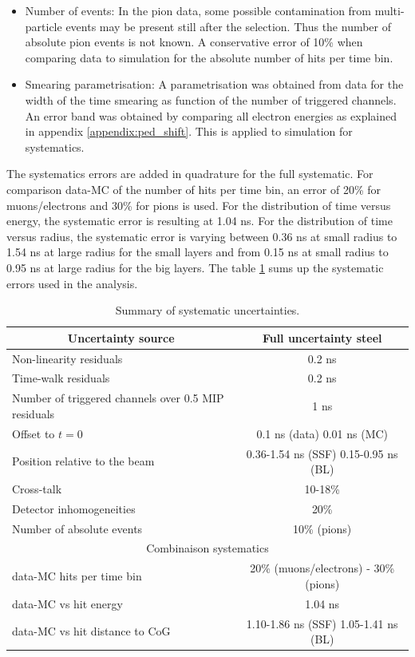 \begin{itemize}
	\item Number of events: In the pion data, some possible contamination from multi-particle events may be present still after the selection. Thus the number of absolute pion events is not known. A conservative error of 10\% when comparing data to simulation for the absolute number of hits per time bin.
	\item Smearing parametrisation: A parametrisation was obtained from data for the width of the time smearing as function of the number of triggered channels. An error band was obtained by comparing all electron energies as explained in appendix \ref{appendix:ped_shift}. This is applied to simulation for systematics.
\end{itemize}

The systematics errors are added in quadrature for the full systematic. For comparison data-MC of the number of hits per time bin, an error of 20\% for muons/electrons and 30\% for pions is used. For the distribution of time versus energy, the systematic error is resulting at 1.04 ns. For the distribution of time versus radius, the systematic error is varying between 0.36 ns at small radius to 1.54 ns at large radius for the small layers and from 0.15 ns at small radius to 0.95 ns at large radius for the big layers. The table \ref{table:time_syst} sums up the systematic errors used in the analysis.
{
\renewcommand{\arraystretch}{1.2}
\begin{table}[htb!]
	\centering
	\caption{Summary of systematic uncertainties.}
	\label{table:time_syst}
	\begin{tabular}{@{} |l|c| @{}}
		\hline
		\multicolumn{1}{|c|}{Uncertainty source} & Full uncertainty steel \\
		\hline
		Non-linearity residuals & 0.2 ns \\
		Time-walk residuals & 0.2 ns \\
		Number of triggered channels over 0.5 MIP residuals & 1 ns \\
		Offset to $t=0$ & 0.1 ns (data) 0.01 ns (MC) \\
		Position relative to the beam & 0.36-1.54 ns (SSF) 0.15-0.95 ns (BL) \\
		Cross-talk & 10-18\% \\
		Detector inhomogeneities & 20\% \\
		Number of absolute events & 10\% (pions) \\
		\hline
		\hline
		\multicolumn{2}{|c|}{Combinaison systematics} \\
		\hline
		data-MC hits per time bin & 20\% (muons/electrons) - 30\% (pions) \\
		data-MC vs hit energy & 1.04 ns \\
		data-MC vs hit distance to CoG & 1.10-1.86 ns (SSF) 1.05-1.41 ns (BL) \\
		\hline
	\end{tabular}
\end{table}
}

